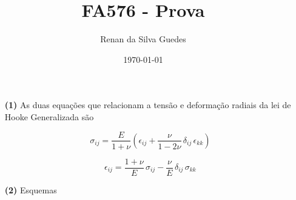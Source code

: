 \documentclass[a4paper, 12pt, brazilian]{article}
\title{FA576 - Prova}
\author{Renan da Silva Guedes}
\date{\today}
\begin{document}
	\maketitle
	\begin{itemize}
		\item[\textbf{(1)}] As duas equações que relacionam a tensão e deformação radiais da lei de Hooke Generalizada são
		
		\begin{equation}
			\sigma_{ij}=\dfrac{E}{1+\nu}\left(\epsilon_{ij}+\dfrac{\nu}{1-2\nu}\,\delta_{ij}\,\epsilon_{kk}\right)
		\end{equation}
		
		\begin{equation}
			\epsilon_{ij}=\dfrac{1+\nu}{E}\,\sigma_{ij}-\dfrac{\nu}{E}\,\delta_{ij}\,\sigma_{kk}
		\end{equation}
		
		\item[\textbf{(2)}] Esquemas
		

\end{itemize}
\end{document}
